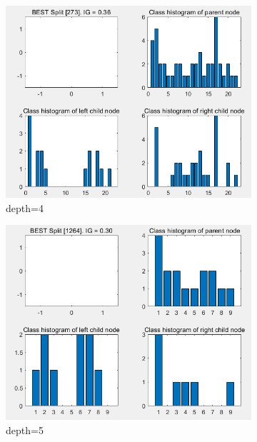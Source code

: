 \begin{figure}
	\begin{subfigure}{0.33\linewidth}
		\centering
		\includegraphics[width=\linewidth]{image/q5-app/hist4.png}
		\caption{depth=4}
	\end{subfigure}%
	\hfill
	\begin{subfigure}{0.33\linewidth}
		\centering
		\includegraphics[width=\linewidth]{image/q5-app/hist5.png}
		\caption{depth=5}
	\end{subfigure}
	\hfill
	\begin{subfigure}{0.33\linewidth}
		\centering

\end{subfigure}
\end{figure}

